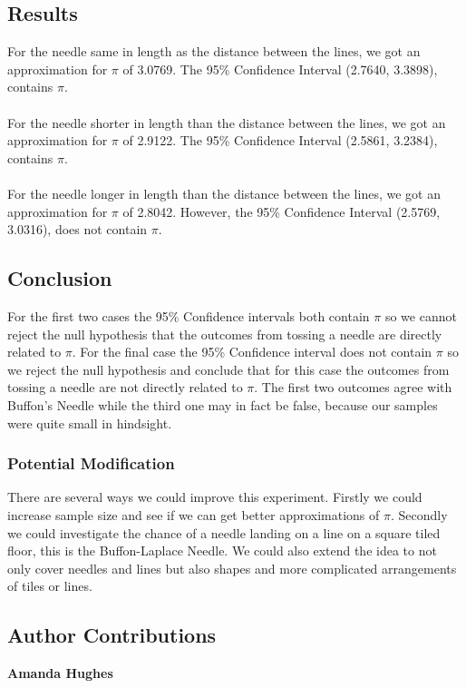 \subsection{Results}

For the needle same in length as the distance between the lines, we got an approximation for $\pi$ of  3.0769. The 95\% Confidence Interval (2.7640, 3.3898), contains $\pi$.\\
\\
For the needle shorter in length than the distance between the lines, we got an approximation for $\pi$ of 2.9122. The 95\% Confidence Interval (2.5861, 3.2384), contains $\pi$.\\
\\
For the needle longer in length than the distance between the lines, we got an approximation for $\pi$ of 2.8042. However, the 95\% Confidence Interval (2.5769, 3.0316), does not contain $\pi$.


\subsection{Conclusion}

For the first two cases the 95\% Confidence intervals both contain $\pi$ so we cannot reject the null hypothesis that the outcomes from tossing a needle are directly related to $\pi$. For the final case the 95\% Confidence interval does not contain $\pi$ so we reject the null hypothesis and conclude that for this case the outcomes from tossing a needle are not directly related to $\pi$. The first two outcomes agree with Buffon's Needle while the third one may in fact be false, because our samples were quite small in hindsight.


\subsubsection*{Potential Modification}

There are several ways we could improve this experiment. Firstly we could increase sample size and see if we can get better approximations of $\pi$. Secondly we could investigate the chance of a needle landing on a line on a square tiled floor, this is the Buffon-Laplace Needle. We could also extend the idea to not only cover needles and lines but also shapes and more complicated arrangements of tiles or lines.

\subsection*{Author Contributions}
\textbf{Amanda Hughes}


